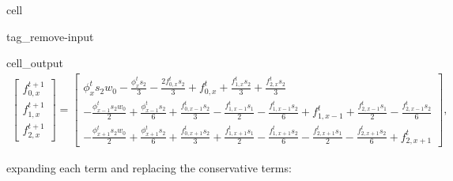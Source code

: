 \documentclass[letterpaper,10pt,english,openany,oneside]{jupyterBook}
\begin{document}
\begin{sphinxuseclass}{cell}
\begin{sphinxuseclass}{tag_remove-input}\begin{sphinxVerbatimOutput}

\begin{sphinxuseclass}{cell_output}\begin{equation*}
\begin{split}\displaystyle \left[\begin{matrix}f_{0,x}^{t+1}\\f_{1,x}^{t+1}\\f_{2,x}^{t+1}\end{matrix}\right] = \left[\begin{matrix}\phi^{t}_{x} s_{2} w_{0} - \frac{\phi^{t}_{x} s_{2}}{3} - \frac{2 f_{0,x}^{t} s_{2}}{3} + f_{0,x}^{t} + \frac{f_{1,x}^{t} s_{2}}{3} + \frac{f_{2,x}^{t} s_{2}}{3}\\- \frac{\phi_{x-1}^t s_{2} w_{0}}{2} + \frac{\phi_{x-1}^t s_{2}}{6} + \frac{f_{0,x-1}^{t} s_{2}}{3} - \frac{f_{1,x-1}^{t} s_{1}}{2} - \frac{f_{1,x-1}^{t} s_{2}}{6} + f_{1,x-1}^{t} + \frac{f_{2,x-1}^{t} s_{1}}{2} - \frac{f_{2,x-1}^{t} s_{2}}{6}\\- \frac{\phi_{x+1}^t s_{2} w_{0}}{2} + \frac{\phi_{x+1}^t s_{2}}{6} + \frac{f_{0,x+1}^{t} s_{2}}{3} + \frac{f_{1,x+1}^{t} s_{1}}{2} - \frac{f_{1,x+1}^{t} s_{2}}{6} - \frac{f_{2,x+1}^{t} s_{1}}{2} - \frac{f_{2,x+1}^{t} s_{2}}{6} + f_{2,x+1}^{t}\end{matrix}\right],\end{split}
\end{equation*}
\end{sphinxuseclass}\end{sphinxVerbatimOutput}

\end{sphinxuseclass}
\end{sphinxuseclass}
\sphinxAtStartPar
expanding each term and replacing the conservative terms:
\end{document}
